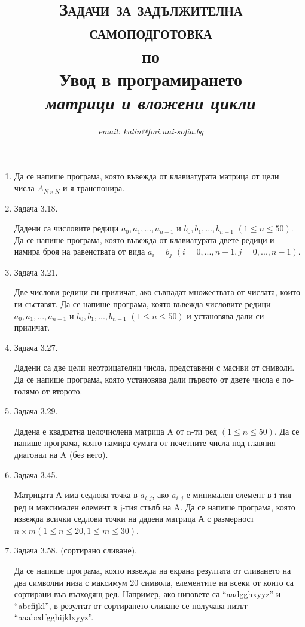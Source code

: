 \documentclass[12pt,a4paper]{article}
\author{\textit{email: kalin@fmi.uni-sofia.bg}}
\title{\textsc{Задачи за задължителна самоподготовка} \\
по \\
Увод в програмирането\\
\textit{матрици и вложени цикли}}
\begin{document}
\maketitle


\begin{enumerate}
	
	\item
	

		Да се напише програма, която въвежда от клавиатурата матрица от цели числа $A_{N\times N}$ и я транспонира.


	\item Задача 3.18. 

	Дадени са числовите редици $a_0, a_1, ..., a_{n-1}$ и $b_0, b_1, ..., b_{n-1}$ $(1 \leq n \leq 50)$. Да се напише програма, която въвежда от клавиатурата двете редици и намира броя на равенствата от вида $a_i = b_j$ $(i = 0, ..., n-1, j = 0, ..., n-1)$.


	\item Задача 3.21. 

	Две числови редици си приличат, ако съвпадат множествата от числата, които ги съставят. Да се напише програма, която въвежда числовите редици $a_0, a_1, ..., a_{n-1}$ и $b_0, b_1, ..., b_{n-1}$ $(1 \leq n \leq 50)$ и установява дали си приличат.

	\item Задача 3.27. 

	Дадени са две цели неотрицателни числа, представени с масиви от символи. Да се напише програма, която установява дали първото от двете числа е по-голямо от второто.


	\item Задача 3.29. 

Дадена е квадратна целочислена матрица A от n-ти ред $(1 \leq n \leq 50)$. Да се напише програма, която намира сумата от нечетните числа под главния диагонал на A (без него).

  \item Задача 3.45. 

  Матрицата А има седлова точка в $a_{i,j}$, ако $a_{i,j}$ е минимален елемент в i-тия ред и максимален елемент в j-тия стълб на A. Да се напише програма, която извежда всички седлови точки на дадена матрица А с размерност $n \times m (1 \leq n \leq 20, 1 \leq m \leq 30)$.


 \item Задача 3.58. (сортирано сливане). 

  Да се напише програма, която извежда на екрана резултата от сливането на два символни низа с максимум 20 символа, елементите на всеки от които са сортирани във възходящ ред. Например, ако низовете са ``aadgghxyyz'' и ``abcfijkl'', в резултат от сортирането сливане се получава низът ``aaabcdfgghijklxyyz''.


\end{enumerate}
\end{document}
